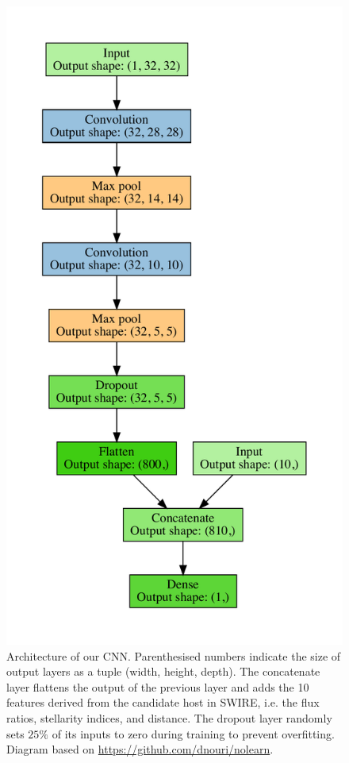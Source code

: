     \begin{figure}
      \includegraphics[width=\linewidth]{atlas-images/cnn_model_graph}
      \caption[Architecture of our CNN.]{Architecture of our CNN. {Parenthesised numbers indicate
      the size of output layers as a tuple (width, height, depth).} The
      concatenate layer flattens the output of the previous layer and adds the
      10 features derived from the candidate host in SWIRE, i.e. the flux
      ratios, stellarity indices, and distance. The dropout layer randomly
      sets $25\%$ of its inputs to zero during training to prevent
      overfitting. Diagram based on \url{ https://github.com/dnouri/nolearn}.}
      \label{fig:cnn}
    \end{figure}

